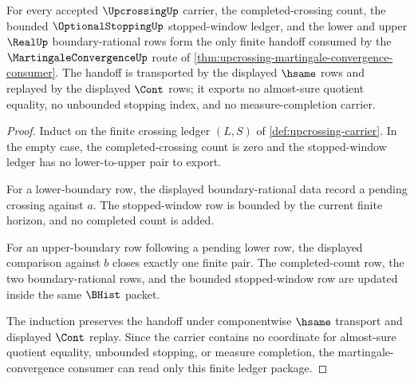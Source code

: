 \begin{theorem}
\label{thm:upcrossing-finite-ledger-handoff}
For every accepted $\UpcrossingUp$ carrier, the completed-crossing count, the bounded $\OptionalStoppingUp$ stopped-window ledger, and the lower and upper $\RealUp$ boundary-rational rows form the only finite handoff consumed by the $\MartingaleConvergenceUp$ route of \autoref{thm:upcrossing-martingale-convergence-consumer}. The handoff is transported by the displayed $\hsame$ rows and replayed by the displayed $\Cont$ rows; it exports no almost-sure quotient equality, no unbounded stopping index, and no measure-completion carrier.
\end{theorem}
\begin{proof}
Induct on the finite crossing ledger $(L,S)$ of \autoref{def:upcrossing-carrier}. In the empty case, the completed-crossing count is zero and the stopped-window ledger has no lower-to-upper pair to export.

For a lower-boundary row, the displayed boundary-rational data record a pending crossing against $a$. The stopped-window row is bounded by the current finite horizon, and no completed count is added.

For an upper-boundary row following a pending lower row, the displayed comparison against $b$ closes exactly one finite pair. The completed-count row, the two boundary-rational rows, and the bounded stopped-window row are updated inside the same $\BHist$ packet.

The induction preserves the handoff under componentwise $\hsame$ transport and displayed $\Cont$ replay. Since the carrier contains no coordinate for almost-sure quotient equality, unbounded stopping, or measure completion, the martingale-convergence consumer can read only this finite ledger package.
\end{proof}

